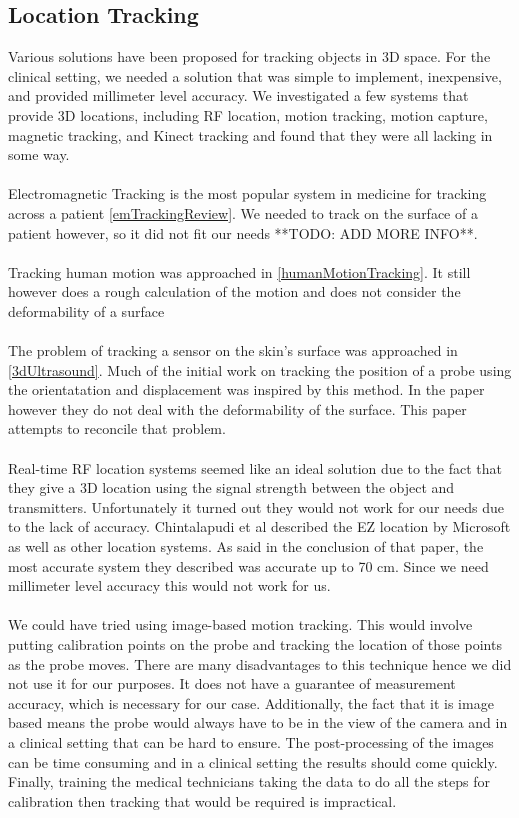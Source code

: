 \subsection{Location Tracking}

Various solutions have been proposed for tracking objects in 3D space. For the clinical setting, we needed a solution that was simple to implement, inexpensive, and provided millimeter level accuracy. We investigated a few systems that provide 3D locations, including RF location, motion tracking, motion capture, magnetic tracking, and Kinect tracking and found that they were all lacking in some way. \\
\\
Electromagnetic Tracking is the most popular system in medicine for tracking across a patient \ref{emTrackingReview}. We needed to track on the surface of a patient however, so it did not fit our needs **TODO: ADD MORE INFO**. \\
\\
Tracking human motion was approached in \ref{humanMotionTracking}. It still however does a rough calculation of the motion and does not consider the deformability of a surface\\
\\
The problem of tracking a sensor on the skin's surface was approached in \ref{3dUltrasound}. Much of the initial work on tracking the position of a probe using the orientatation and displacement was inspired by this method. In the paper however they do not deal with the deformability of the surface. This paper attempts to reconcile that problem. \\
\\
Real-time RF location systems seemed like an ideal solution due to the fact that they give a 3D location using the signal strength between the object and transmitters. Unfortunately it turned out they would not work for our needs due to the lack of accuracy. Chintalapudi et al \cite{ezlocation} described the EZ location by Microsoft as well as other location systems. As said in the conclusion of that paper, the most accurate system they described was accurate up to 70 cm. Since we need millimeter level accuracy this would not work for us. \\
\\
We could have tried using image-based motion tracking. This would involve putting calibration points on the probe and tracking the location of those points as the probe moves. There are many disadvantages to this technique hence we did not use it for our purposes. It does not have a guarantee of measurement accuracy, which is necessary for our case. Additionally, the fact that it is image based means the probe would always have to be in the view of the camera and in a clinical setting that can be hard to ensure. The post-processing of the images can be time consuming and in a clinical setting the results should come quickly. Finally, training the medical technicians taking the data to do all the steps for calibration then tracking that would be required is impractical. \\
